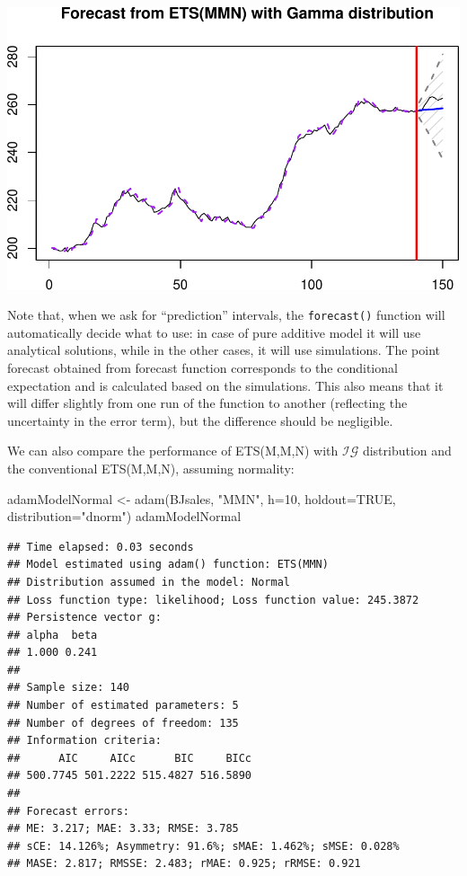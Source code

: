 \documentclass[
]{book}
\newenvironment{Shaded}{\begin{snugshade}}{\end{snugshade}}
\newcommand{\AttributeTok}[1]{\textcolor[rgb]{0.77,0.63,0.00}{#1}}
\newcommand{\ConstantTok}[1]{\textcolor[rgb]{0.00,0.00,0.00}{#1}}
\newcommand{\DecValTok}[1]{\textcolor[rgb]{0.00,0.00,0.81}{#1}}
\newcommand{\FunctionTok}[1]{\textcolor[rgb]{0.00,0.00,0.00}{#1}}
\newcommand{\NormalTok}[1]{#1}
\newcommand{\OtherTok}[1]{\textcolor[rgb]{0.56,0.35,0.01}{#1}}
\newcommand{\StringTok}[1]{\textcolor[rgb]{0.31,0.60,0.02}{#1}}
\theoremstyle{definition}
\theoremstyle{definition}
\theoremstyle{definition}
\theoremstyle{definition}
\theoremstyle{remark}
\begin{document}
\includegraphics{adam_files/figure-latex/unnamed-chunk-37-1.pdf}

Note that, when we ask for ``prediction'' intervals, the \texttt{forecast()} function will automatically decide what to use: in case of pure additive model it will use analytical solutions, while in the other cases, it will use simulations. The point forecast obtained from forecast function corresponds to the conditional expectation and is calculated based on the simulations. This also means that it will differ slightly from one run of the function to another (reflecting the uncertainty in the error term), but the difference should be negligible.

We can also compare the performance of ETS(M,M,N) with \(\mathcal{IG}\) distribution and the conventional ETS(M,M,N), assuming normality:

\begin{Shaded}
\begin{Highlighting}[]
\NormalTok{adamModelNormal }\OtherTok{\textless{}{-}} \FunctionTok{adam}\NormalTok{(BJsales, }\StringTok{"MMN"}\NormalTok{, }\AttributeTok{h=}\DecValTok{10}\NormalTok{, }\AttributeTok{holdout=}\ConstantTok{TRUE}\NormalTok{,}
                        \AttributeTok{distribution=}\StringTok{"dnorm"}\NormalTok{)}
\NormalTok{adamModelNormal}
\end{Highlighting}
\end{Shaded}

\begin{verbatim}
## Time elapsed: 0.03 seconds
## Model estimated using adam() function: ETS(MMN)
## Distribution assumed in the model: Normal
## Loss function type: likelihood; Loss function value: 245.3872
## Persistence vector g:
## alpha  beta 
## 1.000 0.241 
## 
## Sample size: 140
## Number of estimated parameters: 5
## Number of degrees of freedom: 135
## Information criteria:
##      AIC     AICc      BIC     BICc 
## 500.7745 501.2222 515.4827 516.5890 
## 
## Forecast errors:
## ME: 3.217; MAE: 3.33; RMSE: 3.785
## sCE: 14.126%; Asymmetry: 91.6%; sMAE: 1.462%; sMSE: 0.028%
## MASE: 2.817; RMSSE: 2.483; rMAE: 0.925; rRMSE: 0.921
\end{verbatim}
\end{document}
